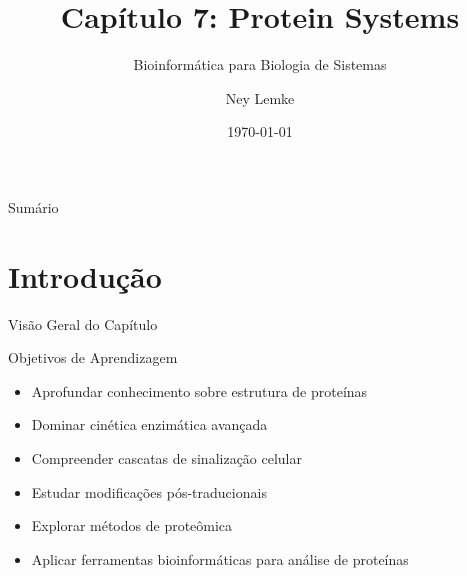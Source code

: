 


\usetikzlibrary{decorations.pathmorphing}

\title[Cap. 7: Protein Systems]{Capítulo 7: Protein Systems}
\subtitle{Bioinformática para Biologia de Sistemas}
\author{Ney Lemke}
\date{\today}



\begin{frame}{}
\titlepage
\end{frame}

\begin{frame}{Sumário}
\tableofcontents
\end{frame}

\section{Introdução}

\begin{frame}{Visão Geral do Capítulo}
\begin{block}{Objetivos de Aprendizagem}
\begin{itemize}
    \item Aprofundar conhecimento sobre estrutura de proteínas
    \item Dominar cinética enzimática avançada
    \item Compreender cascatas de sinalização celular
    \item Estudar modificações pós-traducionais
    \item Explorar métodos de proteômica
    \item Aplicar ferramentas bioinformáticas para análise de proteínas
\end{itemize}
\end{block}

\vspace{0.3cm}

\end{frame}

